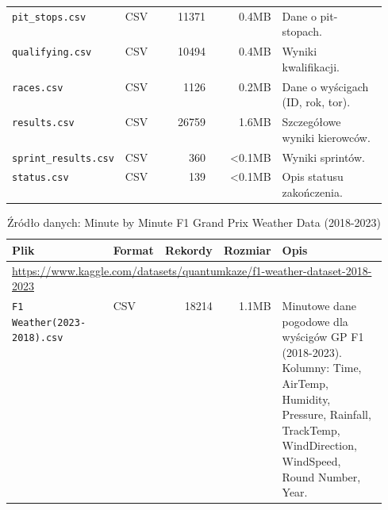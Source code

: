 \documentclass[a4paper,12pt]{article}
\begin{document}
\begin{table}[H]
\begin{tabular}{|p{0.27\linewidth}|l|r|r|p{0.28\linewidth}|}
    \texttt{pit\_stops.csv}             & CSV             & 11371            & 0.4MB            & Dane o pit-stopach.                                                                            \\
    \texttt{qualifying.csv}             & CSV             & 10494            & 0.4MB            & Wyniki kwalifikacji.                                                                           \\
    \texttt{races.csv}                  & CSV             & 1126             & 0.2MB            & Dane o wyścigach (ID, rok, tor).                                                               \\
    \texttt{results.csv}                & CSV             & 26759            & 1.6MB            & Szczegółowe wyniki kierowców.                                                                  \\
    \texttt{sprint\_results.csv}        & CSV             & 360              & <0.1MB           & Wyniki sprintów.                                                                               \\
    \texttt{status.csv}                 & CSV             & 139              & <0.1MB           & Opis statusu zakończenia.                                                                      \\
    \hline
  \end{tabular}
\end{table}

\begin{table}[H]
  \centering
  \caption{Źródło danych: Minute by Minute F1 Grand Prix Weather Data (2018-2023)}
  \label{tab:zrodlo_pogoda_final}
  \tiny
  \begin{tabular}{|p{0.27\linewidth}|l|r|r|p{0.28\linewidth}|}
    \hline
    \textbf{Plik}                      & \textbf{Format} & \textbf{Rekordy} & \textbf{Rozmiar} & \textbf{Opis}                                                                                                                                                         \\
    \hline
    \multicolumn{5}{|l|}{\parbox{\dimexpr\linewidth-2\tabcolsep\relax}{\tiny\url{https://www.kaggle.com/datasets/quantumkaze/f1-weather-dataset-2018-2023}}}                                                                                                           \\
    \hline
    \texttt{F1 Weather(2023-2018).csv} & CSV             & 18214            & 1.1MB            & Minutowe dane pogodowe dla wyścigów GP F1 (2018-2023). Kolumny: Time, AirTemp, Humidity, Pressure, Rainfall, TrackTemp, WindDirection, WindSpeed, Round Number, Year. \\
    \hline
  \end{tabular}
\end{table}
\end{document}
